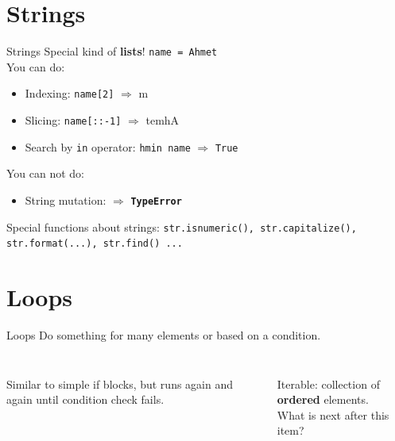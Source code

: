     \section{Strings}
        \begin{frame}{Strings}
            \LARGE
            Special kind of \textbf{lists}!
            \pause
             \texttt{name = \textquotesingle Ahmet\textquotesingle\\}
            \pause
            You can do:
            \begin{itemize}
                \item Indexing: \texttt{name[2]} $\Rightarrow$ \textquotesingle m\textquotesingle
                \pause
                \item Slicing: \texttt{name[::-1]} $\Rightarrow$ \textquotesingle temhA\textquotesingle
                \pause
                \item Search by \texttt{in} operator: \texttt{\textquotesingle hm\textquotesingle in name} $\Rightarrow$ \texttt{True}
            \end{itemize}
            \pause
            You can not do:
            \begin{itemize}
                \item String mutation:  $\Rightarrow$ \textbf{\texttt{TypeError}}
            \end{itemize}
            \pause
            Special functions about strings: \texttt{str.isnumeric(), str.capitalize(), str.format(...), str.find() ...}
        \end{frame}

    \section{Loops}
        \begin{frame}{Loops}
            \LARGE Do something for many elements or based on a condition.
            \begin{columns}
                \begin{column}{0.5\textwidth}
                    \inputminted[frame=single,framesep=2pt]{python3}{../Lecture3/code-examples/while1.py}
                    Similar to simple if blocks, but runs again and again until condition check fails.
                \end{column}
                \begin{column}{0.5\textwidth}
                    \inputminted[frame=single,framesep=2pt]{python3}{../Lecture3/code-examples/for1.py}
                    Iterable: collection of \textbf{ordered} elements.\\
                    What is next after this item?\\
                \end{column}
            \end{columns}
        \end{frame}

